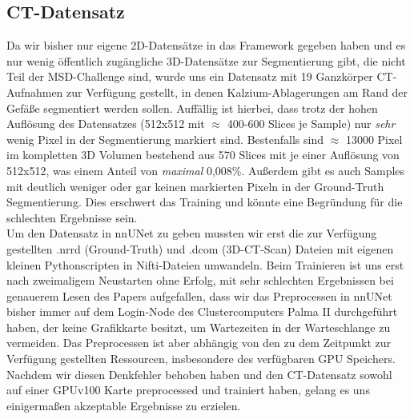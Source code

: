 \subsection{CT-Datensatz}
Da wir bisher nur eigene 2D-Datensätze in das Framework gegeben haben und es nur wenig öffentlich zugängliche 3D-Datensätze zur Segmentierung gibt, die nicht Teil der MSD-Challenge \cite{msdChallenge} sind, wurde uns ein Datensatz mit 19 Ganzkörper CT-Aufnahmen zur Verfügung gestellt, in denen Kalzium-Ablagerungen am Rand der Gefäße segmentiert werden sollen.
Auffällig ist hierbei, dass trotz der hohen Auflösung des Datensatzes (512x512 mit $\approx$ 400-600 Slices je Sample) nur \textit{sehr} wenig Pixel in der Segmentierung markiert sind. Bestenfalls sind $\approx$ 13000 Pixel im kompletten 3D Volumen bestehend aus 570 Slices mit je einer Auflösung von 512x512, was einem Anteil von \textit{maximal} 0,008\%. Außerdem gibt es auch Samples mit deutlich weniger oder gar keinen markierten Pixeln in der Ground-Truth Segmentierung.  Dies erschwert das Training und könnte eine Begründung für die  schlechten Ergebnisse sein.\\
Um den Datensatz in nnUNet zu geben mussten wir erst die zur Verfügung gestellten .nrrd (Ground-Truth) und .dcom (3D-CT-Scan) Dateien mit eigenen kleinen Pythonscripten \cite{autoMLGithub} in Nifti-Dateien umwandeln. Beim Trainieren ist uns erst nach zweimaligem Neustarten ohne Erfolg, mit sehr schlechten Ergebnissen bei genauerem Lesen des Papers aufgefallen, dass wir das Preprocessen in nnUNet bisher immer auf dem Login-Node des Clustercomputers Palma II durchgeführt haben, der keine Grafikkarte besitzt, um Wartezeiten in der Warteschlange zu vermeiden. Das Preprocessen ist aber abhängig von den zu dem Zeitpunkt zur Verfügung gestellten Ressourcen, insbesondere des verfügbaren GPU Speichers. Nachdem wir diesen Denkfehler behoben haben und den CT-Datensatz sowohl auf einer GPUv100 Karte preprocessed und trainiert haben, gelang es uns  einigermaßen akzeptable Ergebnisse zu erzielen. 

